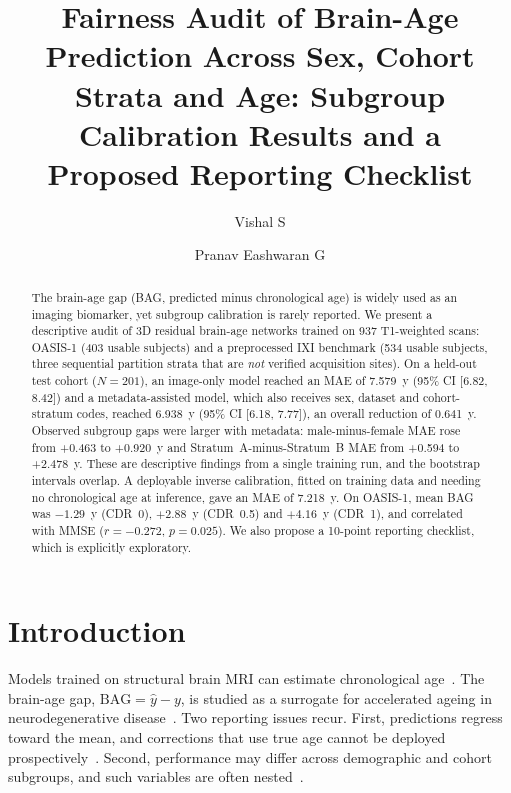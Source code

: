 \documentclass[runningheads]{llncs}
\begin{document}
\title{Fairness Audit of Brain-Age Prediction Across Sex, Cohort Strata and Age: Subgroup Calibration Results and a Proposed Reporting Checklist}
\author{Vishal S \and Pranav Eashwaran G}
\maketitle

\begin{abstract}
The brain-age gap (BAG, predicted minus chronological age) is widely used as an imaging biomarker, yet subgroup calibration is rarely reported. We present a descriptive audit of 3D residual brain-age networks trained on 937 T1-weighted scans: OASIS-1 (403 usable subjects) and a preprocessed IXI benchmark (534 usable subjects, three sequential partition strata that are \emph{not} verified acquisition sites). On a held-out test cohort ($N=201$), an image-only model reached an MAE of 7.579~y (95\% CI [6.82, 8.42]) and a metadata-assisted model, which also receives sex, dataset and cohort-stratum codes, reached 6.938~y (95\% CI [6.18, 7.77]), an overall reduction of 0.641~y. Observed subgroup gaps were larger with metadata: male-minus-female MAE rose from +0.463 to +0.920~y and Stratum~A-minus-Stratum~B MAE from +0.594 to +2.478~y. These are descriptive findings from a single training run, and the bootstrap intervals overlap. A deployable inverse calibration, fitted on training data and needing no chronological age at inference, gave an MAE of 7.218~y. On OASIS-1, mean BAG was $-1.29$~y (CDR~0), $+2.88$~y (CDR~0.5) and $+4.16$~y (CDR~1), and correlated with MMSE ($r=-0.272$, $p=0.025$). We also propose a 10-point reporting checklist, which is explicitly exploratory.
\end{abstract}

\section{Introduction}
Models trained on structural brain MRI can estimate chronological age~\cite{cole2017predicting,franke2010cross}. The brain-age gap, $\text{BAG}=\hat{y}-y$, is studied as a surrogate for accelerated ageing in neurodegenerative disease~\cite{cole2017trends}. Two reporting issues recur. First, predictions regress toward the mean, and corrections that use true age cannot be deployed prospectively~\cite{de2020bias,beheshti2019bias}. Second, performance may differ across demographic and cohort subgroups, and such variables are often nested~\cite{fortin2018harmonization,mehrabi2021survey}.
\end{document}
